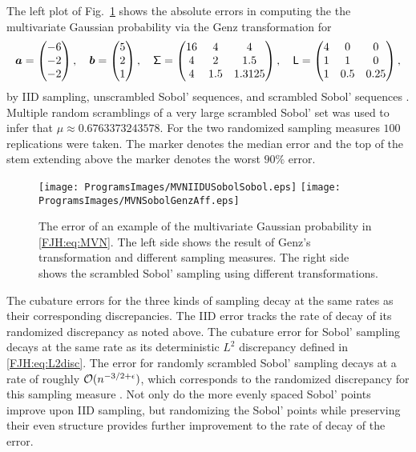 \documentclass[graybox,footinfo]{svmult}
\begin{document}
The left plot of Fig.\ \ref{FJH:fig:MVNfig} shows the absolute errors in computing the the 
multivariate 
Gaussian probability via the Genz transformation for 
\[
   {\boldsymbol{a}}  = \begin{pmatrix}
   -6 \\ -2 \\ -2
   \end{pmatrix}, \quad
      {\boldsymbol{b}}  = \begin{pmatrix}
   5 \\ 2 \\ 1
   \end{pmatrix}, \quad
   \mathsf{\Sigma} = \begin{pmatrix} 16 & 4 & 4 \\ 4 &  2 &  1.5 \\
  4 & 1.5 &  1.3125 \end{pmatrix}, \quad
   \mathsf{L} = \begin{pmatrix} 4 & 0 & 0 \\ 1 &  1 &  0 \\
1 & 0.5 &  0.25 \end{pmatrix}, 
\]
by IID sampling, unscrambled Sobol' sequences, and scrambled Sobol' sequences   
\cite{Owe95, Owe98c}.
Multiple random scramblings of a very large scrambled Sobol' set was used to infer that 
$\mu \approx 0.6763373243578$.   For the two randomized sampling measures $100$ 
replications were taken.  The marker denotes the median error and the top of the stem 
extending above the marker denotes the worst $90\%$ error.

\begin{figure}
	\centering
	\texttt{[image: ProgramsImages/MVNIIDUSobolSobol.eps]} 
	\qquad 
	\texttt{[image: ProgramsImages/MVNSobolGenzAff.eps]}
	\caption{The error of an example of the multivariate Gaussian probability in 
	\eqref{FJH:eq:MVN}.  The left side shows the result of Genz's transformation and 
	different sampling measures.  The right side shows the scrambled Sobol' sampling 
	using different transformations.
	\label{FJH:fig:MVNfig}}
\end{figure}

The cubature errors for the three kinds of sampling decay at the same rates as their 
corresponding discrepancies.  The IID error tracks the rate of decay of its randomized 
discrepancy as noted above.  The cubature  error for  Sobol' 
sampling decays at the same rate as its deterministic $L^2$ discrepancy defined in 
\eqref{FJH:eq:L2disc}.  The error for randomly scrambled Sobol' 
sampling decays at a rate of roughly ${\mathcal{O}}(n^{-3/2+\epsilon})$, which corresponds to 
the randomized discrepancy for this sampling measure \cite{HeiHicYue02a,Owe97}.  
Not only do the more evenly spaced Sobol' points improve upon IID sampling, but 
randomizing the Sobol' points while preserving their even structure provides further 
improvement to the rate of decay of the error.
\end{document}

